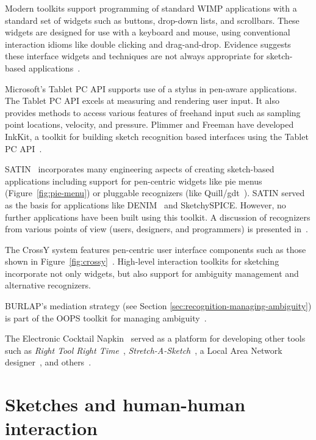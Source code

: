 Modern toolkits support programming of standard WIMP applications with
a standard set of widgets such as buttons, drop-down lists, and
scrollbars. These widgets are designed for use with a keyboard and
mouse, using conventional interaction idioms like double clicking and
drag-and-drop. Evidence suggests these interface widgets and
techniques are not always appropriate for sketch-based
applications~\cite{difiore-sketching-artistic,saund-inferred-mode,alvarado-skrui-guidelines}.

Microsoft's Tablet PC API supports use of a stylus in pen-aware
applications. The Tablet PC API excels at measuring and rendering user
input. It also provides methods to access various features of freehand
input such as sampling point locations, velocity, and
pressure. Plimmer and Freeman have developed InkKit, a toolkit for
building sketch recognition based interfaces using the Tablet PC
API~\cite{plimmer-inkkit}.

SATIN~\cite{hong-satin} incorporates many engineering aspects of
creating sketch-based applications including support for pen-centric
widgets like pie menus (Figure~\ref{fig:pie-menu}) or pluggable
recognizers (like Quill/gdt~\cite{long-quill-chi}). SATIN served as
the basis for applications like DENIM~\cite{lin-denim} and
SketchySPICE. However, no further applications have been built using
this toolkit. A discussion of recognizers from various points of view
(users, designers, and programmers) is presented
in~\cite{hong-recognizers}.

The CrossY system features pen-centric user interface components such
as those shown in
Figure~\ref{fig:crossy}~\cite{apitz-crossy}. High-level interaction
toolkits for sketching incorporate not only widgets, but also support
for ambiguity management and alternative recognizers. 

BURLAP's mediation strategy (see
Section \ref{sec:recognition-managing-ambiguity}) is part of the OOPS
toolkit for managing ambiguity~\cite{mankoff-oops}.

The Electronic Cocktail Napkin~\cite{gross-ecn-uist} served as a
platform for developing other tools such as \textit{Right Tool Right
Time}~\cite{do-design-sketches-tools},
\textit{Stretch-A-Sketch}~\cite{gross-stretch-a-sketch},
a Local Area Network designer~\cite{kuczun-lan-sketcher}, and
others~\cite{gross-boe}.

\section{Sketches and human-human interaction}

